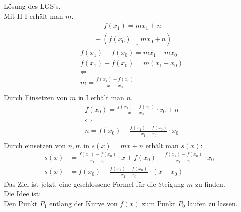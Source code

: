 Lösung des LGS's.\\
Mit II-I erhält man $ m $.\\
\begin{align*}
&\;\;\;\;\;\;\;\;\;\;\;\;f(x_1)=mx_1+n \\
&\;\;\;\;\;\;\;-(\underline{f(x_0)=mx_0+n })\\
&f(x_1)-f(x_0)=mx_1-mx_0\\
&f(x_1)-f(x_0)=m(x_1-x_0)\\
&\Leftrightarrow\\
&m=\frac{f(x_1)-f(x_0)}{x_1-x_0}\\
\end{align*}
Durch Einsetzen von $ m $ in I erhält man $ n $.\\
\begin{align*}
&f(x_0)=\frac{f(x_1)-f(x_0)}{x_1-x_0}\cdot x_0+n\\
&\Leftrightarrow\\
&n=f(x_0)-\frac{f(x_1)-f(x_0)}{x_1-x_0}\cdot x_0\\
\end{align*}
Durch einsetzen von $ n,m $ in $ s(x)=mx+n $ erhält man $ s(x) $:
\begin{align*}
s(x)&=\frac{f(x_1)-f(x_0)}{x_1-x_0}\cdot x+f(x_0)-\frac{f(x_1)-f(x_0)}{x_1-x_0}\cdot x_0\\
s(x)&=f(x_0)+\frac{f(x_1)-f(x_0)}{x_1-x_0}\cdot(x-x_0)
\end{align*}
Das Ziel ist jetzt, eine geschlossene Formel für die Steigung $ m $ zu finden.\\
Die Idee ist:\\
Den Punkt $ P_1 $ entlang der Kurve von $ f(x) $ zum Punkt $ P_0 $ laufen zu lassen.\\
